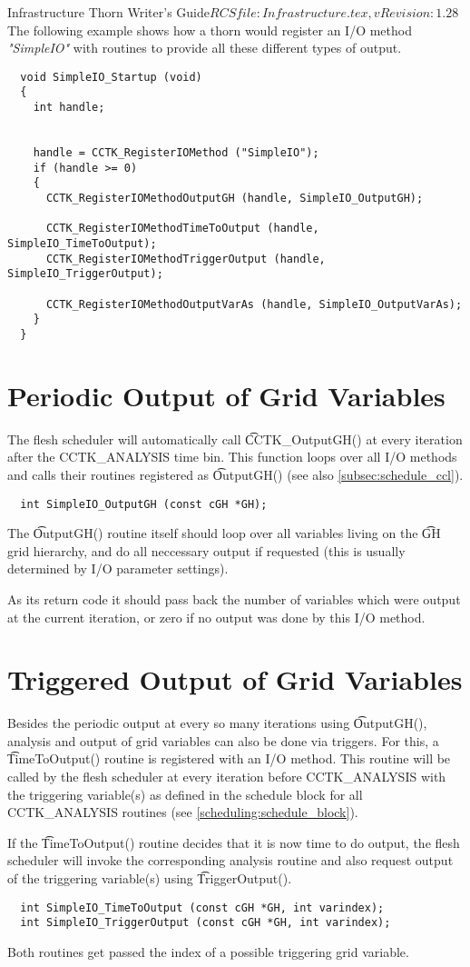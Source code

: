 \begin{cactuspart}{4}{Infrastructure Thorn Writer's Guide}{$RCSfile: Infrastructure.tex,v $}{$Revision: 1.28 $}
The following example shows how a thorn would register an I/O method {\it
"SimpleIO"} with routines to provide all these different types of output.
%
\begin{verbatim}
  void SimpleIO_Startup (void)
  {
    int handle;


    handle = CCTK_RegisterIOMethod ("SimpleIO");
    if (handle >= 0)
    {
      CCTK_RegisterIOMethodOutputGH (handle, SimpleIO_OutputGH);

      CCTK_RegisterIOMethodTimeToOutput (handle, SimpleIO_TimeToOutput);
      CCTK_RegisterIOMethodTriggerOutput (handle, SimpleIO_TriggerOutput);

      CCTK_RegisterIOMethodOutputVarAs (handle, SimpleIO_OutputVarAs);
    }
  }
\end{verbatim}
%
%
\section{Periodic Output of Grid Variables}
%
The flesh scheduler will automatically call {\t CCTK\_OutputGH()} at every
iteration after the CCTK\_ANALYSIS time bin. This function loops over all I/O
methods and calls their routines registered as {\t OutputGH()} (see also
\ref{subsec:schedule_ccl}).
%
\begin{verbatim}
  int SimpleIO_OutputGH (const cGH *GH);
\end{verbatim}
%
The {\t OutputGH()} routine itself should loop over all variables living on the
{\t GH} grid hierarchy, and do all neccessary output if requested (this is
usually determined by I/O parameter settings).

As its return code it should pass back the number of variables which were output
at the current iteration, or zero if no output was done by this I/O method.
%
%
\section{Triggered Output of Grid Variables}
%
Besides the periodic output at every so many iterations using {\t OutputGH()},
analysis and output of grid variables can also be done via triggers. For this,
a {\t TimeToOutput()} routine is registered with an I/O method.
This routine will be called by the flesh scheduler at every iteration before
CCTK\_ANALYSIS with the triggering variable(s) as defined in the schedule
block for all CCTK\_ANALYSIS routines (see \ref{scheduling:schedule_block}).

If the {\t TimeToOutput()} routine decides that it is now time to do output, the
flesh scheduler will invoke the corresponding analysis routine and also request
output of the triggering variable(s) using {\t TriggerOutput()}.
%
\begin{verbatim}
  int SimpleIO_TimeToOutput (const cGH *GH, int varindex);
  int SimpleIO_TriggerOutput (const cGH *GH, int varindex);
\end{verbatim}
%
Both routines get passed the index of a possible triggering grid variable.


\end{cactuspart}

